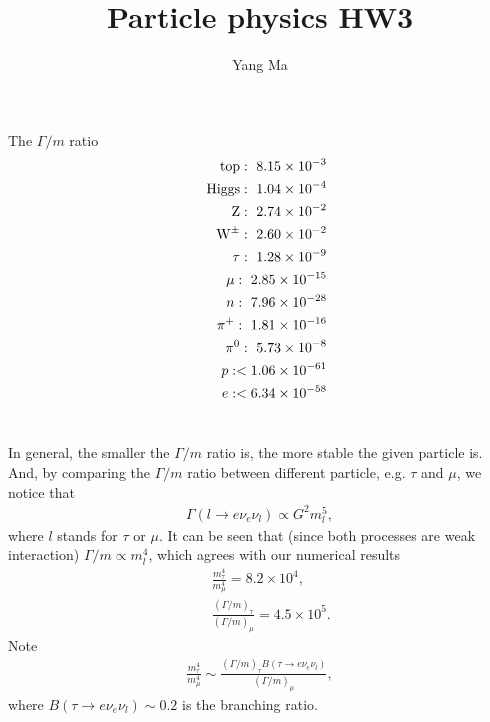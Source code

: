 \documentclass[11pt]{article}
\begin{document}
\title{Particle physics HW3}
\author{Yang Ma}

\maketitle


\section{ }
The $\Gamma/m$ ratio
\begin{eqnarray}
  &&{\rm top}:~ 8.15 \times 10^{-3}\\
  &&{\rm Higgs}:~ 1.04 \times 10^{-4}\\
  &&{\rm Z}: ~ 2.74 \times  10^{-2}\\
  &&{\rm W}^\pm: ~ 2.60 \times 10^{-2}\\
  &&{\tau}: ~ 1.28 \times 10^{-9}\\
  &&{\mu}: ~ 2.85 \times 10^{-15}\\
  &&{n}: ~ 7.96 \times  10^{-28} \\
  &&{\pi}^+: ~ 1.81 \times  10^{-16} \\
  &&{\pi}^0: ~ 5.73 \times  10^{-8} \\
  &&{ p}: < 1.06 \times  10^{-61}\\
  &&{e}: < 6.34 \times  10^{-58}
\end{eqnarray}

\section{ }
In general, the smaller the $\Gamma/m$ ratio is, the more stable the given particle is.
And, by comparing the $\Gamma/m$ ratio between different particle, e.g. $\tau$ and $\mu$, we notice that
\begin{eqnarray}
  \Gamma(l \to e \nu_e \nu_l) \propto G^2 m^5_l,
\end{eqnarray}
where $l$ stands for $\tau$ or $\mu$. It can be seen that (since both processes are weak interaction) $\Gamma/m \propto m_l^4$, which agrees with our numerical results
\begin{eqnarray}
  &&\frac{m_{\tau}^4}{m_{\mu}^4} = 8.2 \times 10^4, \\
  &&\frac{(\Gamma/m)_{\tau}}{(\Gamma/m)_{\mu}} = 4.5 \times 10^5.
\end{eqnarray}
Note 
\begin{eqnarray}
  \frac{m_{\tau}^4}{m_{\mu}^4} \sim \frac{(\Gamma/m)_{\tau} B (\tau \to e \nu_e \nu_l )}{(\Gamma/m)_{\mu}},
\end{eqnarray}
where $B (\tau \to e \nu_e \nu_l ) \sim 0.2$ is the branching ratio.
\end{document}
